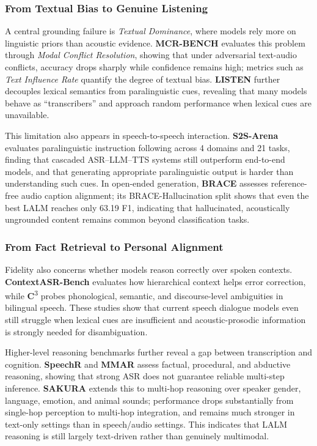 \subsubsection{From Textual Bias to Genuine Listening}
\label{sec:5.1.2}
A central grounding failure is \textit{Textual Dominance}, where models rely more on linguistic priors than acoustic evidence. \textbf{MCR-BENCH} \cite{wang2025audio} evaluates this problem through \textit{Modal Conflict Resolution}, showing that under adversarial text-audio conflicts, accuracy drops sharply while confidence remains high; metrics such as \textit{Text Influence Rate} quantify the degree of textual bias. \textbf{LISTEN} \cite{chen2025audio} further decouples lexical semantics from paralinguistic cues, revealing that many models behave as ``transcribers'' and approach random performance when lexical cues are unavailable.

This limitation also appears in speech-to-speech interaction. \textbf{S2S-Arena} \cite{jiang2025s2s} evaluates paralinguistic instruction following across 4 domains and 21 tasks, finding that cascaded ASR--LLM--TTS systems still outperform end-to-end models, and that generating appropriate paralinguistic output is harder than understanding such cues. In open-ended generation, \textbf{BRACE} \cite{guo2025brace} assesses reference-free audio caption alignment; its BRACE-Hallucination split shows that even the best LALM reaches only 63.19 F1, indicating that hallucinated, acoustically ungrounded content remains common beyond classification tasks.

\subsubsection{From Fact Retrieval to Personal Alignment}
\label{sec:5.1.3}
Fidelity also concerns whether models reason correctly over spoken contexts. \textbf{ContextASR-Bench} \cite{wang2025contextasr} evaluates how hierarchical context helps error correction, while \textbf{C}\textsuperscript{3} \cite{ma2025c3} probes phonological, semantic, and discourse-level ambiguities in bilingual speech. These studies show that current speech dialogue models even still struggle when lexical cues are insufficient and acoustic-prosodic information is strongly needed for disambiguation.

Higher-level reasoning benchmarks further reveal a gap between transcription and cognition. \textbf{SpeechR} \cite{yang2025speechr} and \textbf{MMAR} \cite{ma2025mmar} assess factual, procedural, and abductive reasoning, showing that strong ASR does not guarantee reliable multi-step inference. \textbf{SAKURA} \cite{yang2025sakura} extends this to multi-hop reasoning over speaker gender, language, emotion, and animal sounds; performance drops substantially from single-hop perception to multi-hop integration, and remains much stronger in text-only settings than in speech/audio settings. This indicates that LALM reasoning is still largely text-driven rather than genuinely multimodal.

